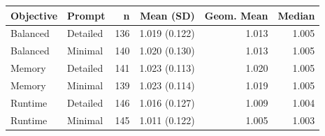 \begin{tabular}{llrrrr}
\toprule
Objective & Prompt & n & Mean (SD) & Geom. Mean & Median \\
\midrule
Balanced & Detailed & 136 & 1.019 (0.122) & 1.013 & 1.005 \\
Balanced & Minimal & 140 & 1.020 (0.130) & 1.013 & 1.005 \\
Memory & Detailed & 141 & 1.023 (0.113) & 1.020 & 1.005 \\
Memory & Minimal & 139 & 1.023 (0.114) & 1.019 & 1.005 \\
Runtime & Detailed & 146 & 1.016 (0.127) & 1.009 & 1.004 \\
Runtime & Minimal & 145 & 1.011 (0.122) & 1.005 & 1.003 \\
\bottomrule
\end{tabular}
